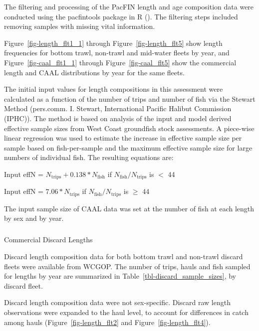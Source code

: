 \documentclass[
]{scrartcl}
\makeatletter
\let\oldsubparagraph\subparagraph
\renewcommand{\subparagraph}{
    \@ifstar
      \xxxSubParagraphStar
      \xxxSubParagraphNoStar
  }
\newcommand{\xxxSubParagraphStar}[1]{\oldsubparagraph*{#1}\mbox{}}
\newcommand{\xxxSubParagraphNoStar}[1]{\oldsubparagraph{#1}\mbox{}}
\makeatother
\begin{document}
The filtering and processing of the PacFIN length and age composition
data were conducted using the \gls{pacfintools} package in R
(). The filtering steps included removing samples with missing vital
information.

Figure~\ref{fig-length_flt1_1} through Figure~\ref{fig-length_flt5} show
length frequencies for bottom trawl, non-trawl and mid-water fleets by
year, and Figure~\ref{fig-caal_flt1_1} through
Figure~\ref{fig-caal_flt5} show the commercial length and CAAL
distributions by year for the same fleets.

The initial input values for length compositions in this assessment were
calculated as a function of the number of trips and number of fish via
the Stewart Method (pers.comm. I. Stewart, International Pacific Halibut
Commission (IPHC)). The method is based on analysis of the input and
model derived effective sample sizes from West Coast groundfish stock
assessments. A piece-wise linear regression was used to estimate the
increase in effective sample size per sample based on fish-per-sample
and the maximum effective sample size for large numbers of individual
fish. The resulting equations are:

\begin{centering}

Input effN = $N_{\text{trips}} + 0.138 * N_{\text{fish}}$ if $N_{\text{fish}}/N_{\text{trips}}$ is $<$ 44

Input effN = $7.06 * N_{\text{trips}}$ if $N_{\text{fish}}/N_{\text{trips}}$ is $\geq$ 44

\end{centering}

The input sample size of CAAL data was set at the number of fish at each
length by sex and by year.

\subparagraph{Commercial Discard
Lengths}\label{commercial-discard-lengths}

Discard length composition data for both bottom trawl and non-trawl
discard fleets were available from WCGOP. The number of trips, hauls and
fish sampled for lengths by year are summarized in
Table~\ref{tbl-discard_sample_sizes}, by discard fleet.

Discard length composition data were not sex-specific. Discard raw
length observations were expanded to the haul level, to account for
differences in catch among hauls (Figure~\ref{fig-length_flt2} and
Figure~\ref{fig-length_flt4}).
\end{document}
